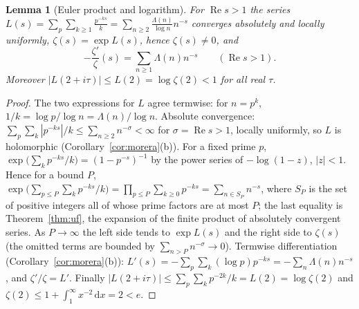 \documentclass[11pt]{article}
\newtheorem{lemma}[theorem]{Lemma}
\theoremstyle{definition}
\newcommand{\Lam}{\Lambda}
\newcommand{\re}{\operatorname{Re}}
\newcommand{\dd}{\,\mathrm{d}}
\begin{document}
\begin{lemma}[Euler product and logarithm]\label{lem:euler}
For $\re s>1$ the series $L(s)=\sum_{p}\sum_{k\ge1}\frac{p^{-ks}}{k}=\sum_{n\ge2}\frac{\Lam(n)}{\log n}n^{-s}$ converges absolutely and locally uniformly, $\zeta(s)=\exp L(s)$, hence $\zeta(s)\neq0$, and
\[
-\frac{\zeta'}{\zeta}(s)=\sum_{n\ge1}\Lam(n)n^{-s}\qquad(\re s>1).
\]
Moreover $|L(2+i\tau)|\le L(2)=\log\zeta(2)<1$ for all real $\tau$.
\end{lemma}
\begin{proof}
The two expressions for $L$ agree termwise: for $n=p^{k}$, $1/k=\log p/\log n=\Lam(n)/\log n$.
Absolute convergence: $\sum_p\sum_k|p^{-ks}|/k\le\sum_{n\ge2}n^{-\sigma}<\infty$ for $\sigma=\re s>1$, locally uniformly, so $L$ is holomorphic (Corollary~\ref{cor:morera}(b)).
For a fixed prime $p$, $\exp\bigl(\sum_k p^{-ks}/k\bigr)=(1-p^{-s})^{-1}$ by the power series of $-\log(1-z)$, $|z|<1$.
Hence for a bound $P$, $\exp\bigl(\sum_{p\le P}\sum_k p^{-ks}/k\bigr)=\prod_{p\le P}\sum_{k\ge0}p^{-ks}=\sum_{n\in S_P}n^{-s}$, where $S_P$ is the set of positive integers all of whose prime factors are at most $P$; the last equality is Theorem~\ref{thm:uf}, the expansion of the finite product of absolutely convergent series.
As $P\to\infty$ the left side tends to $\exp L(s)$ and the right side to $\zeta(s)$ (the omitted terms are bounded by $\sum_{n>P}n^{-\sigma}\to0$).
Termwise differentiation (Corollary~\ref{cor:morera}(b)): $L'(s)=-\sum_p\sum_k(\log p)p^{-ks}=-\sum_{n}\Lam(n)n^{-s}$, and $\zeta'/\zeta=L'$.
Finally $|L(2+i\tau)|\le\sum_p\sum_k p^{-2k}/k=L(2)=\log\zeta(2)$ and $\zeta(2)\le 1+\int_1^\infty x^{-2}\dd x=2<e$.
\end{proof}
\end{document}
